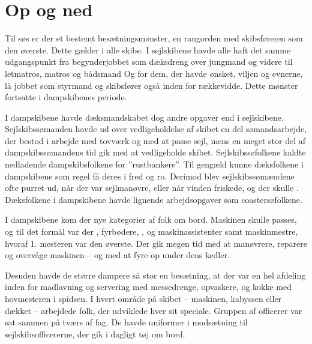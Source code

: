 \chapter{Op og ned}\label{op-og-ned}

Til søs er der et bestemt besætningsmønster, en rangorden med
skibsføreren som den øverste. Dette gælder i alle skibe. I sejlskibene
havde alle haft det samme udgangspunkt fra begynderjobbet som dæksdreng
over jungmand og videre til letmatros, matros og bådsmand Og for dem,
der havde ønsket, viljen og evnerne, lå jobbet som styrmand og
skibsfører også inden for rækkevidde. Dette mønster fortsatte i
dampskibenes periode.

I dampskibene havde dæksmandskabet dog andre
opgaver end i sejlskibene. Sejlskibssømanden havde ud over
vedligeholdelse af skibet en del sømandsarbejde, der bestod i arbejde
med tovværk og med at passe sejl, mens en meget stor del af
dampskibssømandens tid gik med at vedligeholde skibet.
Sejlskibssøfolkene kaldte nedladende dampskibsfolkene for
''rustbankere''. Til gengæld kunne dæksfolkene i dampskibene som regel
få deres  i fred og ro. Derimod blev sejlskibssømændene ofte
purret ud, når der var sejlmanøvre, eller når vinden friskede, og der
skulle . Dæksfolkene i dampskibene
havde lignende
arbejdsopgaver som coastersøfolkene. 

I dampskibene kom der nye kategorier af folk om bord. Maskinen skulle
passes, og til det formål var der ,
fyrbødere,
, og
maskinassistenter samt maskinmestre, hvoraf 1. mesteren var den øverste.
Der gik megen tid med at manøvrere, reparere og overvåge maskinen -- og
med at fyre op under dens kedler.

Desuden havde de større dampere så stor en besætning, at der var en hel
afdeling inden for madlavning og servering med messedrenge, opvaskere,
 og kokke med hovmesteren i spidsen. I hvert område på
skibet -- maskinen, kabyssen eller dækket -- arbejdede folk, der
udviklede hver sit speciale. Gruppen af officerer var sat sammen på
tværs af fag. De havde uniformer i modsætning til sejlskibsofficererne,
der gik i dagligt tøj om bord.

